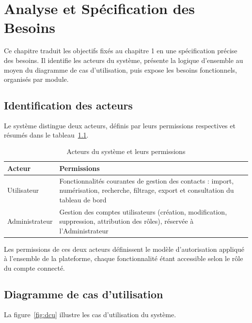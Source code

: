 
\chapter{Analyse et Spécification des Besoins}

Ce chapitre traduit les objectifs fixés au chapitre 1 en une spécification précise des besoins. Il identifie les acteurs du système, présente la logique d'ensemble au moyen du diagramme de cas d'utilisation, puis expose les besoins fonctionnels, organisés par module.

\section{Identification des acteurs}

Le système distingue deux acteurs, définis par leurs permissions respectives et résumés dans le tableau~\ref{tab:acteurs}.

\begin{table}[H]
\centering
\small
\begin{tabularx}{\textwidth}{|l|X|}
\hline
\textbf{Acteur} & \textbf{Permissions} \\
\hline
Utilisateur & Fonctionnalités courantes de gestion des contacts : import, numérisation, recherche, filtrage, export et consultation du tableau de bord \\
\hline
Administrateur & Gestion des comptes utilisateurs (création, modification, suppression, attribution des rôles), réservée à l'Administrateur \\
\hline
\end{tabularx}
\caption{Acteurs du système et leurs permissions}
\label{tab:acteurs}
\end{table}

Les permissions de ces deux acteurs définissent le modèle d'autorisation appliqué à l'ensemble de la plateforme, chaque fonctionnalité étant accessible selon le rôle du compte connecté.

\section{Diagramme de cas d'utilisation}

La figure~\ref{fig:dcu} illustre les cas d'utilisation du système.

